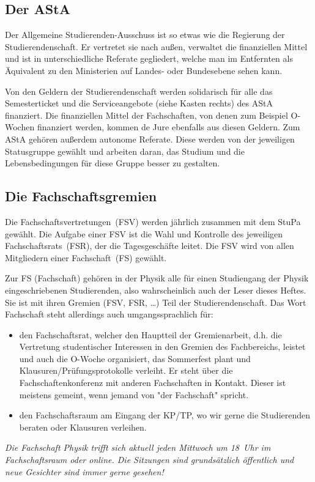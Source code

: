 \begin{multicols*}{2}
\subsection{Der AStA}
Der Allgemeine Studierenden-Ausschuss ist so etwas wie die Regierung der Studierendenschaft. Er vertretet sie nach außen, verwaltet die finanziellen Mittel und ist in unterschiedliche Referate gegliedert, welche man im Entfernten als Äquivalent zu den Ministerien auf Landes- oder Bundesebene sehen kann.

Von den Geldern der Studierendenschaft werden solidarisch für alle das Semesterticket und die Serviceangebote (siehe Kasten rechts) des AStA finanziert. Die finanziellen Mittel der Fachschaften, von denen zum Beispiel O-Wochen finanziert werden, kommen de Jure ebenfalls aus diesen Geldern. Zum AStA gehören außerdem autonome Referate. Diese werden von der jeweiligen Statusgruppe gewählt und arbeiten daran, das Studium und die Lebensbedingungen für diese Gruppe besser zu gestalten.


\subsection{Die Fachschaftsgremien}
Die Fachschaftsvertretungen~(FSV) werden jährlich zusammen mit dem StuPa gewählt.
Die Aufgabe einer FSV ist die Wahl und Kontrolle des jeweiligen Fachschaftsrats~(FSR), der die Tagesgeschäfte leitet.
Die FSV wird von allen Mitgliedern einer Fachschaft~(FS) gewählt.


Zur FS (Fachschaft) gehören in der Physik alle für einen Studiengang der Physik eingeschriebenen Studierenden, also wahrscheinlich auch der Leser dieses Heftes. Sie ist mit ihren Gremien (FSV, FSR, \dots) Teil der Studierendenschaft. 
Das Wort Fachschaft steht allerdings auch umgangssprachlich für:
\begin{itemize}
	\item den Fachschaftsrat, welcher den Hauptteil der Gremienarbeit, d.h. die Vertretung studentischer Interessen in den Gremien des Fachbereichs, leistet und auch die O-Woche organisiert, das Sommerfest plant und Klausuren/Prüfungsprotokolle verleiht. Er steht über die Fachschaftenkonferenz mit anderen Fachschaften in Kontakt.
Dieser ist meistens gemeint, wenn jemand von "der Fachschaft" spricht.
	\item den Fachschaftsraum am Eingang der KP/TP, wo wir gerne die Studierenden beraten oder Klausuren verleihen.
\end{itemize}
\emph{Die Fachschaft Physik trifft sich aktuell jeden Mittwoch um 18~Uhr im Fachschaftsraum oder online.
Die Sitzungen sind grundsätzlich öffentlich und neue Gesichter sind immer gerne gesehen!}



\end{multicols*}
